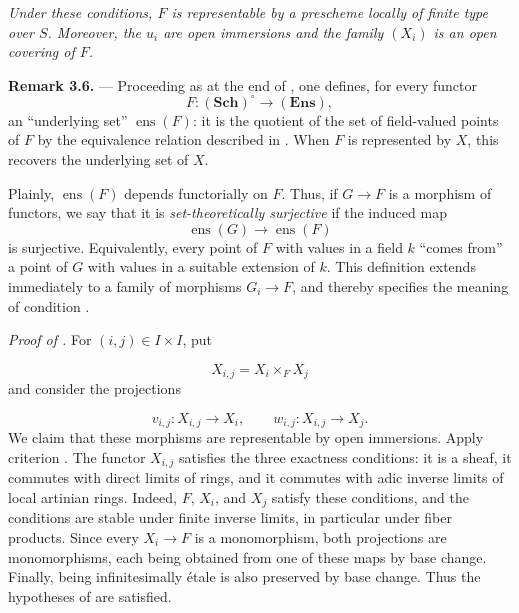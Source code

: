 \textit{Under these conditions, \(F\) is representable by a
prescheme locally of finite type over \(S\).  Moreover, the \(u_i\)
are open immersions and the family \((X_i)\) is an open covering of
\(F\).}

\medskip
\noindent{}\textbf{Remark 3.6.} ---
Proceeding as at the end of
, one defines, for every
functor
\[
  F:(\mathbf{Sch})^\circ\longrightarrow(\mathbf{Ens}),
\]
an ``underlying set'' \(\operatorname{ens}(F)\): it is the quotient
of the set of field-valued points of \(F\) by the equivalence relation
described in .  When \(F\) is represented by \(X\), this recovers
the underlying set of \(X\).

Plainly, \(\operatorname{ens}(F)\) depends functorially on \(F\).
Thus, if \(G\to F\) is a morphism of functors, we say that it is
\emph{set-theoretically surjective} if the induced map
\[
  \operatorname{ens}(G)\longrightarrow\operatorname{ens}(F)
\]
is surjective.  Equivalently, every point of \(F\) with values in a
field \(k\) ``comes from'' a point of \(G\) with values in a suitable
extension of \(k\).  This definition extends immediately to a family
of morphisms \(G_i\to F\), and thereby specifies the meaning of
condition .

\medskip
\noindent\textit{Proof of .}
For \((i,j)\in I\times I\), put

\[
  X_{i,j}=X_i\times_F X_j
\]
and consider the projections

\[
  v_{i,j}:X_{i,j}\longrightarrow X_i,
  \qquad
  w_{i,j}:X_{i,j}\longrightarrow X_j.
\]
We claim that these morphisms are representable by open immersions.
Apply criterion
.
The functor \(X_{i,j}\) satisfies the three exactness conditions:
it is a sheaf, it commutes with direct limits of rings, and it
commutes with adic inverse limits of local artinian rings.  Indeed,
\(F\), \(X_i\), and \(X_j\) satisfy these conditions, and the
conditions are stable under finite inverse limits, in particular
under fiber products.  Since every \(X_i\to F\) is a monomorphism,
both projections are monomorphisms, each being obtained from one of
these maps by base change.  Finally, being infinitesimally étale is
also preserved by base change.  Thus the hypotheses of  are
satisfied.

